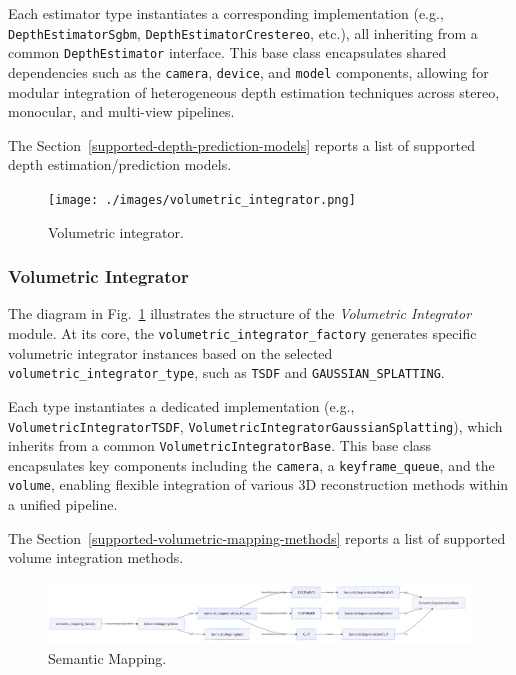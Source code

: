 \documentclass{article}
\begin{document}
Each estimator type instantiates a corresponding implementation (e.g., \texttt{DepthEstimatorSgbm}, \texttt{DepthEstimatorCrestereo}, etc.), all inheriting from a common \texttt{DepthEstimator} interface. This base class encapsulates shared dependencies such as the \texttt{camera}, \texttt{device}, and \texttt{model} components, allowing for modular integration of heterogeneous depth estimation techniques across stereo, monocular, and multi-view pipelines.

The Section~\ref{supported-depth-prediction-models} reports a list of supported depth estimation/prediction models.

\begin{figure}[!t]
\begin{center}
    \texttt{[image: ./images/volumetric\_integrator.png]}
\end{center}
\caption{Volumetric integrator.}
\label{Fig:VolumetricIntegrator}
\end{figure}

\subsubsection{Volumetric Integrator}

The diagram in Fig.~\ref{Fig:VolumetricIntegrator} illustrates the structure of the \textit{Volumetric Integrator} module. At its core, the \texttt{volumetric\_integrator\_factory} generates specific volumetric integrator instances based on the selected \texttt{volumetric\_integrator\_type}, such as \texttt{TSDF} and \texttt{GAUSSIAN\_SPLATTING}.

Each type instantiates a dedicated implementation (e.g., \texttt{VolumetricIntegratorTSDF}, \texttt{VolumetricIntegrator\-Gaussian\-Splatting}), which inherits from a common \texttt{VolumetricIntegratorBase}. This base class encapsulates key components including the \texttt{camera}, a \texttt{keyframe\_queue}, and the \texttt{volume}, enabling flexible integration of various 3D reconstruction methods within a unified pipeline.

The Section~\ref{supported-volumetric-mapping-methods} reports a list of supported volume integration methods.


\begin{figure}[!t]
\begin{center}
    \includegraphics[width=\textwidth]{./images/semantic_mapping.png}
\end{center}
\caption{Semantic Mapping.}
\label{Fig:SemanticMapping}
\end{figure}
\end{document}
